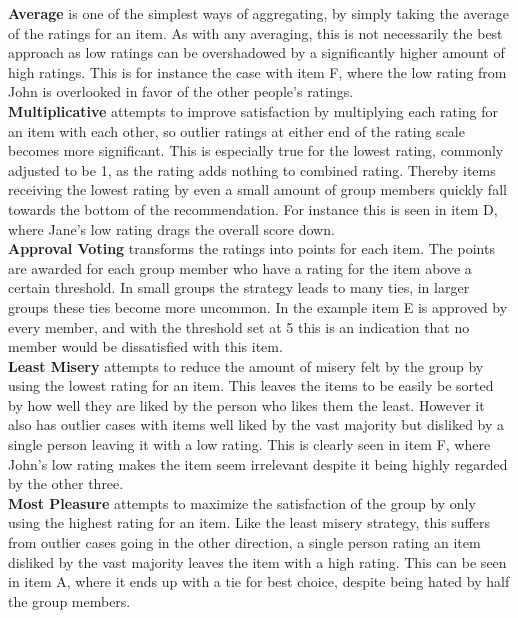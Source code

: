 \textbf{Average} is one of the simplest ways of aggregating, by simply taking the average of the ratings for an item. As with any averaging, this is not necessarily the best approach as low ratings can be overshadowed by a significantly higher amount of high ratings. This is for instance the case with item F, where the low rating from John is overlooked in favor of the other people's ratings.\\

\textbf{Multiplicative} attempts to improve satisfaction by multiplying each rating for an item with each other, so outlier ratings at either end of the rating scale becomes more significant. This is especially true for the lowest rating, commonly adjusted to be 1, as the rating adds nothing to combined rating. Thereby items receiving the lowest rating by even a small amount of group members quickly fall towards the bottom of the recommendation. For instance this is seen in item D, where Jane's low rating drags the overall score down.\\

\textbf{Approval Voting} transforms the ratings into points for each item. The points are awarded for each group member who have a rating for the item above a certain threshold. In small groups the strategy leads to many ties, in larger groups these ties become more uncommon. In the example item E is approved by every member, and with the threshold set at 5 this is an indication that no member would be dissatisfied with this item.\\

\textbf{Least Misery} attempts to reduce the amount of misery felt by the group by using the lowest rating for an item. This leaves the items to be easily be sorted by how well they are liked by the person who likes them the least. However it also has outlier cases with items well liked by the vast majority but disliked by a single person leaving it with a low rating. This is clearly seen in item F, where John's low rating makes the item seem irrelevant despite it being highly regarded by the other three.\\

\textbf{Most Pleasure} attempts to maximize the satisfaction of the group by only using the highest rating for an item. Like the least misery strategy, this suffers from outlier cases going in the other direction, a single person rating an item disliked by the vast majority leaves the item with a high rating. This can be seen in item A, where it ends up with a tie for best choice, despite being hated by half the group members.\\

